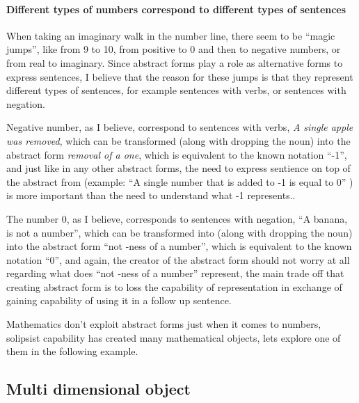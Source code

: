 \documentclass[10pt]{article}
\begin{document}
\paragraph{Different types of numbers correspond to different types of sentences} 
When taking an imaginary walk in the number line, there seem to be “magic jumps”, like  from 9 to 10, from positive to 0 and then to negative numbers, or from real to imaginary. Since abstract forms play a role as alternative forms to express sentences, I believe that the reason for these jumps is that they represent different types of sentences, for example sentences with verbs, or sentences with negation.\par
Negative number, as I believe, correspond to sentences with verbs,  \textit{A single apple was removed}, which can be  transformed (along with dropping the noun)  into the abstract form \textit{removal of a one}, which is equivalent to the known notation “-1”, and just like in any other abstract forms, the need to express sentience on top of the abstract from (example: “A single number that is added to -1 is equal to 0” ) is more important than the need to understand what -1 represents..\par
The number 0, as I believe, corresponds to sentences with negation, “A banana, is not a number”, which can be transformed into (along with dropping the noun)  into the abstract form “not -ness of a number”, which is equivalent to the known notation “0”, and again, the creator of the abstract form should not worry at all regarding what does “not -ness of a number” represent, the main trade off that creating abstract form is to loss the capability of  representation in exchange of  gaining capability of using it in a follow up sentence.

Mathematics don’t exploit abstract forms just when it comes to numbers, solipsist capability has created many mathematical objects, lets explore one of them in the following example.

\subsection*{ Multi dimensional object}
\end{document}
